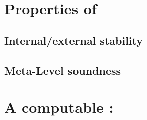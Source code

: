 \section{Properties of }
\subsection{Internal/external stability}
\subsection{Meta-Level soundness}

\section{A computable : }

